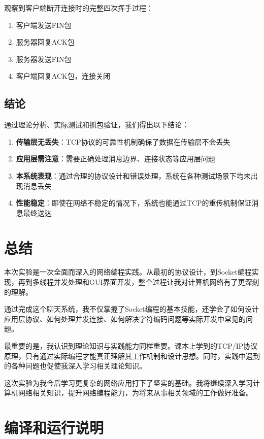 \documentclass[12pt, a4paper]{article}
\begin{document}
观察到客户端断开连接时的完整四次挥手过程：

\begin{enumerate}[itemsep=2pt]
  \item 客户端发送FIN包
  \item 服务器回复ACK包
  \item 服务器发送FIN包
  \item 客户端回复ACK包，连接关闭
\end{enumerate}

\subsection{结论}

通过理论分析、实际测试和抓包验证，我们得出以下结论：

\begin{enumerate}[itemsep=3pt]
  \item \textbf{传输层无丢失}：TCP协议的可靠性机制确保了数据在传输层不会丢失
  \item \textbf{应用层需注意}：需要正确处理消息边界、连接状态等应用层问题
  \item \textbf{本系统表现}：通过合理的协议设计和错误处理，系统在各种测试场景下均未出现消息丢失
  \item \textbf{性能稳定}：即使在网络不稳定的情况下，系统也能通过TCP的重传机制保证消息最终送达
\end{enumerate}


\section{总结}

本次实验是一次全面而深入的网络编程实践。从最初的协议设计，到Socket编程实现，再到多线程并发处理和GUI界面开发，整个过程让我对计算机网络有了更深刻的理解。

通过完成这个聊天系统，我不仅掌握了Socket编程的基本技能，还学会了如何设计应用层协议、如何处理并发连接、如何解决字符编码问题等实际开发中常见的问题。

最重要的是，我认识到理论知识与实践能力同样重要。课本上学到的TCP/IP协议原理，只有通过实际编程才能真正理解其工作机制和设计思想。同时，实践中遇到的各种问题也促使我深入学习相关理论知识。

这次实验为我今后学习更复杂的网络应用打下了坚实的基础。我将继续深入学习计算机网络相关知识，提升网络编程能力，为将来从事相关领域的工作做好准备。

\section*{编译和运行说明}
\end{document}
